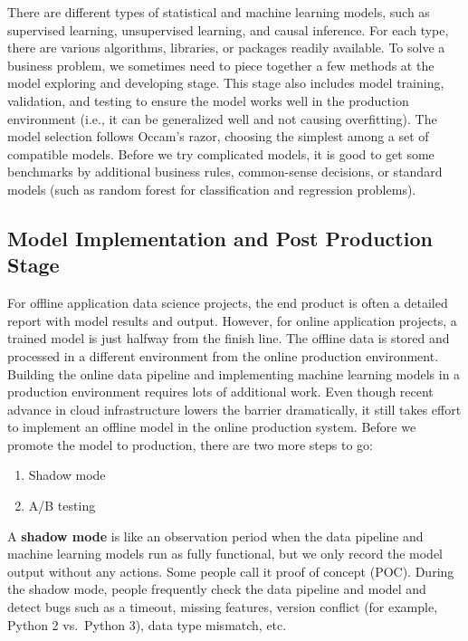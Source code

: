 \documentclass[12pt,]{krantz}
\providecommand{\tightlist}{%
  \setlength{\itemsep}{0pt}\setlength{\parskip}{0pt}}
\begin{document}
There are different types of statistical and machine learning models, such as supervised learning, unsupervised learning, and causal inference. For each type, there are various algorithms, libraries, or packages readily available. To solve a business problem, we sometimes need to piece together a few methods at the model exploring and developing stage. This stage also includes model training, validation, and testing to ensure the model works well in the production environment (i.e., it can be generalized well and not causing overfitting). The model selection follows Occam's razor, choosing the simplest among a set of compatible models. Before we try complicated models, it is good to get some benchmarks by additional business rules, common-sense decisions, or standard models (such as random forest for classification and regression problems).

\hypertarget{model-implementation-and-post-production-stage}{%
\subsection{Model Implementation and Post Production Stage}\label{model-implementation-and-post-production-stage}}

For offline application data science projects, the end product is often a detailed report with model results and output. However, for online application projects, a trained model is just halfway from the finish line. The offline data is stored and processed in a different environment from the online production environment. Building the online data pipeline and implementing machine learning models in a production environment requires lots of additional work. Even though recent advance in cloud infrastructure lowers the barrier dramatically, it still takes effort to implement an offline model in the online production system. Before we promote the model to production, there are two more steps to go:

\begin{enumerate}
\def\labelenumi{\arabic{enumi}.}
\tightlist
\item
  Shadow mode
\item
  A/B testing
\end{enumerate}

A \textbf{shadow mode} is like an observation period when the data pipeline and machine learning models run as fully functional, but we only record the model output without any actions. Some people call it proof of concept (POC). During the shadow mode, people frequently check the data pipeline and model and detect bugs such as a timeout, missing features, version conflict (for example, Python 2 vs.~Python 3), data type mismatch, etc.
\end{document}
